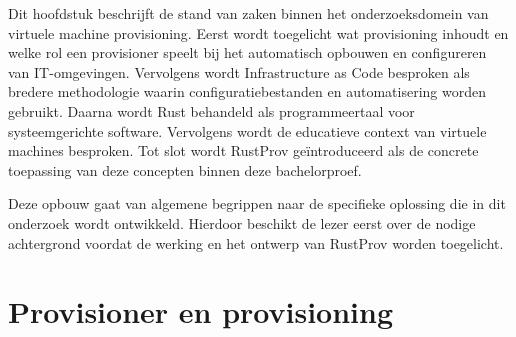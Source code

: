%
%
%
%
Dit hoofdstuk beschrijft de stand van zaken binnen het onderzoeksdomein van virtuele machine provisioning. Eerst wordt toegelicht wat provisioning inhoudt en welke rol een provisioner speelt bij het automatisch opbouwen en configureren van IT-omgevingen. Vervolgens wordt Infrastructure as Code besproken als bredere methodologie waarin configuratiebestanden en automatisering worden gebruikt. Daarna wordt Rust behandeld als programmeertaal voor systeemgerichte software. Vervolgens wordt de educatieve context van virtuele machines besproken. Tot slot wordt RustProv geïntroduceerd als de concrete toepassing van deze concepten binnen deze bachelorproef.

Deze opbouw gaat van algemene begrippen naar de specifieke oplossing die in dit onderzoek wordt ontwikkeld. Hierdoor beschikt de lezer eerst over de nodige achtergrond voordat de werking en het ontwerp van RustProv worden toegelicht.

\section{Provisioner en provisioning}

